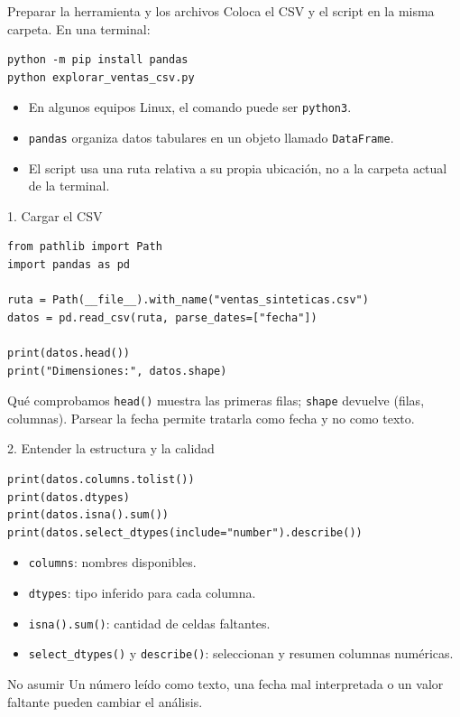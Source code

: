 \documentclass[aspectratio=169,11pt]{beamer}
\begin{document}
\begin{frame}[fragile]{Preparar la herramienta y los archivos}
  Coloca el CSV y el script en la misma carpeta. En una terminal:
  \begin{lstlisting}[style=codigo]
python -m pip install pandas
python explorar_ventas_csv.py
  \end{lstlisting}
  \begin{itemize}
    \item En algunos equipos Linux, el comando puede ser \texttt{python3}.
    \item \texttt{pandas} organiza datos tabulares en un objeto llamado \texttt{DataFrame}.
    \item El script usa una ruta relativa a su propia ubicación, no a la carpeta actual de la terminal.
  \end{itemize}
\end{frame}

\begin{frame}[fragile]{1. Cargar el CSV}
  \begin{lstlisting}[style=codigo]
from pathlib import Path
import pandas as pd

ruta = Path(__file__).with_name("ventas_sinteticas.csv")
datos = pd.read_csv(ruta, parse_dates=["fecha"])

print(datos.head())
print("Dimensiones:", datos.shape)
  \end{lstlisting}
  \begin{block}{Qué comprobamos}
    \texttt{head()} muestra las primeras filas; \texttt{shape} devuelve (filas, columnas). Parsear la fecha permite tratarla como fecha y no como texto.
  \end{block}
\end{frame}

\begin{frame}[fragile]{2. Entender la estructura y la calidad}
  \begin{lstlisting}[style=codigo]
print(datos.columns.tolist())
print(datos.dtypes)
print(datos.isna().sum())
print(datos.select_dtypes(include="number").describe())
  \end{lstlisting}
  \begin{itemize}
    \item \texttt{columns}: nombres disponibles.
    \item \texttt{dtypes}: tipo inferido para cada columna.
    \item \texttt{isna().sum()}: cantidad de celdas faltantes.
    \item \texttt{select\_dtypes()} y \texttt{describe()}: seleccionan y resumen columnas numéricas.
  \end{itemize}
  \begin{alertblock}{No asumir}
    Un número leído como texto, una fecha mal interpretada o un valor faltante pueden cambiar el análisis.
  \end{alertblock}
\end{frame}
\end{document}
